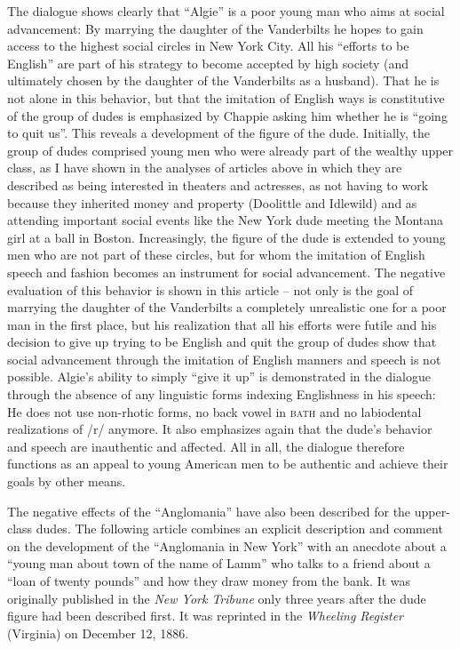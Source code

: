 The dialogue shows clearly that “Algie” is a poor young man who aims at social advancement: By marrying the daughter of the Vanderbilts he hopes to gain access to the highest social circles in New York City. All his “efforts to be English” are part of his strategy to become accepted by high society (and ultimately chosen by the daughter of the Vanderbilts as a husband). That he is not alone in this behavior, but that the imitation of English ways is constitutive of the group of dudes is emphasized by Chappie asking him whether he is “going to quit us”. This reveals a development of the figure of the dude. Initially, the group of dudes comprised young men who were already part of the wealthy upper class, as I have shown in the analyses of articles above in which they are described as being interested in theaters and actresses, as not having to work because they inherited money and property (Doolittle and Idlewild) and as attending important social events like the New York dude meeting the Montana girl at a ball in Boston. Increasingly, the figure of the dude is extended to young men who are not part of these circles, but for whom the imitation of English speech and fashion becomes an instrument for social advancement. The negative evaluation of this behavior is shown in this article – not only is the goal of marrying the daughter of the Vanderbilts a completely unrealistic one for a poor man in the first place, but his realization that all his efforts were futile and his decision to give up trying to be English and quit the group of dudes show that social advancement through the imitation of English manners and speech is not possible. Algie’s ability to simply “give it up” is demonstrated in the dialogue through the absence of any linguistic forms indexing Englishness in his speech: He does not use non-rhotic forms, no back vowel in \textsc{bath} and no labiodental realizations of /r/ anymore. It also emphasizes again that the dude’s behavior and speech are inauthentic and affected. All in all, the dialogue therefore functions as an appeal to young American men to be authentic and achieve their goals by other means.


The negative effects of the “Anglomania” have also been described for the upper-class dudes. The following article combines an explicit description and comment on the development of the “Anglomania in New York” with an anecdote about a “young man about town of the name of Lamm” who talks to a friend about a “loan of twenty pounds” and how they draw money from the bank. It was originally published in the \emph{New York Tribune} only three years after the dude figure had been described first. It was reprinted in the \emph{Wheeling Register} (Virginia) on December 12, 1886.

